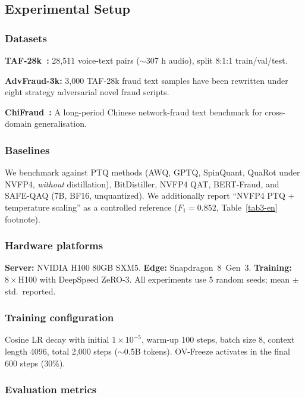 \documentclass[final,5p,times,number]{elsarticle}
\begin{document}
\subsection{Experimental Setup}
\subsubsection{Datasets}

\textbf{TAF-28k~\cite{1}:} 28{,}511 voice-text pairs ($\sim$307 h audio), split 8:1:1 train/val/test.

\textbf{AdvFraud-3k:} 3{,}000 TAF-28k fraud text samples have been rewritten under eight strategy adversarial novel fraud scripts.

\textbf{ChiFraud~\cite{chifraud}:} A long-period Chinese network-fraud text benchmark for cross-domain generalisation.

\subsubsection{Baselines}

We benchmark against PTQ methods (AWQ, GPTQ, SpinQuant, QuaRot under NVFP4, \emph{without} distillation), BitDistiller, NVFP4 QAT, BERT-Fraud, and SAFE-QAQ (7B, BF16, unquantized). We additionally report ``NVFP4 PTQ + temperature scaling'' as a controlled reference ($F_1=0.852$, Table~\ref{tab3-en} footnote).

\subsubsection{Hardware platforms}

\textbf{Server:} NVIDIA H100 80GB SXM5. \textbf{Edge:} Snapdragon~8~Gen~3. \textbf{Training:} $8\times$H100 with DeepSpeed ZeRO-3. All experiments use 5 random seeds; mean $\pm$ std.\ reported.

\subsubsection{Training configuration}

Cosine LR decay with initial $1\times 10^{-5}$, warm-up 100 steps, batch size 8, context length 4096, total 2{,}000 steps ($\sim$0.5B tokens). OV-Freeze activates in the final 600 steps (30\%).

\subsubsection{Evaluation metrics}
\end{document}
